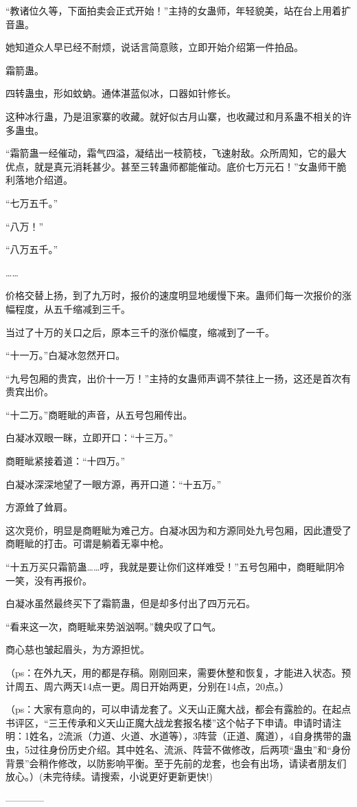 \begin{this_body}
“教诸位久等，下面拍卖会正式开始！”主持的女蛊师，年轻貌美，站在台上用着扩音蛊。

她知道众人早已经不耐烦，说话言简意赅，立即开始介绍第一件拍品。

霜箭蛊。

四转蛊虫，形如蚊蚋。通体湛蓝似冰，口器如针修长。

这种冰行蛊，乃是沮家寨的收藏。就好似古月山寨，也收藏过和月系蛊不相关的许多蛊虫。

“霜箭蛊一经催动，霜气四溢，凝结出一枝箭枝，飞速射敌。众所周知，它的最大优点，就是真元消耗甚少。甚至三转蛊师都能催动。底价七万元石！”女蛊师干脆利落地介绍道。

“七万五千。”

“八万！”

“八万五千。”

……

价格交替上扬，到了九万时，报价的速度明显地缓慢下来。蛊师们每一次报价的涨幅程度，从五千缩减到三千。

当过了十万的关口之后，原本三千的涨价幅度，缩减到了一千。

“十一万。”白凝冰忽然开口。

“九号包厢的贵宾，出价十一万！”主持的女蛊师声调不禁往上一扬，这还是首次有贵宾出价。

“十二万。”商睚眦的声音，从五号包厢传出。

白凝冰双眼一眯，立即开口：“十三万。”

商睚眦紧接着道：“十四万。”

白凝冰深深地望了一眼方源，再开口道：“十五万。”

方源耸了耸肩。

这次竞价，明显是商睚眦为难己方。白凝冰因为和方源同处九号包厢，因此遭受了商睚眦的打击。可谓是躺着无辜中枪。

“十五万买只霜箭蛊……哼，我就是要让你们这样难受！”五号包厢中，商睚眦阴冷一笑，没有再报价。

白凝冰虽然最终买下了霜箭蛊，但是却多付出了四万元石。

“看来这一次，商睚眦来势汹汹啊。”魏央叹了口气。

商心慈也皱起眉头，为方源担忧。

（ps：在外九天，用的都是存稿。刚刚回来，需要休整和恢复，才能进入状态。预计周五、周六两天14点一更。周日开始两更，分别在14点，20点。）

（ps：大家有意向的，可以申请龙套了。义天山正魔大战，都会有露脸的。在起点书评区，“三王传承和义天山正魔大战龙套报名楼”这个帖子下申请。申请时请注明：1姓名，2流派（力道、火道、水道等），3阵营（正道、魔道），4自身携带的蛊虫，5过往身份历史介绍。其中姓名、流派、阵营不做修改，后两项“蛊虫”和“身份背景”会稍作修改，以防影响平衡。至于先前的龙套，也会有出场，请读者朋友们放心。）(未完待续。请搜索，小说更好更新更快!)

------------

\end{this_body}

